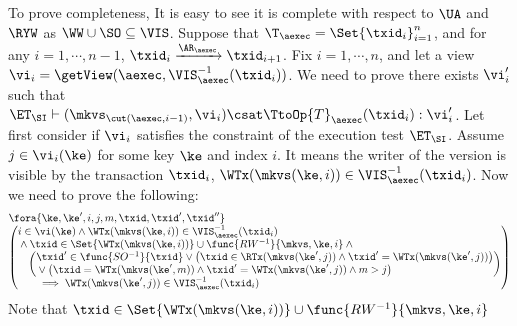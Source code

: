 To prove completeness, 
It is easy to see it is complete with respect to \( \UA \) and \( \RYW \) as \( \WW \cup \SO \subseteq \VIS \).
Suppose that $\T_{\aexec} = \Set{\txid_{i}}_{i=1}^{n}$, and for any $i=1,\cdots, n-1$,
$\txid_{i} \xrightarrow{\AR_{\aexec}} \txid_{i+1}$.
Fix $i=1,\cdots,n$, and let a view $\vi_{i} = \getView(\aexec, \VIS^{-1}_{\aexec}(\txid_{i}))$.
We need to prove there exists \( \vi'_i \) such that 
\( \ET_\SI \vdash ( \mkvs_{\cut(\aexec, i-1)}, \vi_i ) \csat \TtoOp{T}_{\aexec}(\txid_{i}) : \vi'_{i} \).
Let first consider if \( \vi_i \) satisfies the constraint of the execution test \( \ET_\SI \).
Assume \( j \in \vi_i(\ke) \) for some key \(\ke \) and index \( i \).
It means the writer  of the version is visible by the transaction \( \txid_i\),
\ie \( \WTx(\mkvs(\ke,i)) \in \VIS^{-1}_{\aexec}(\txid_{i}) \).
Now we need to prove the following:
\begin{gather}
    \label{equ:si-complete-arvis}
    \begin{array}{@{}l@{}}
        \fora{\ke, \ke', i, j, m, \txid, \txid', \txid''} \\
        \left( \begin{array}{@{}l@{}}
        i \in \vi(\ke) 
        \land \WTx(\mkvs(\ke,i)) \in \VIS^{-1}_{\aexec}(\txid_{i}) \\
        {} \land \txid \in \Set{\WTx(\mkvs(\ke,i))} \cup \func{RW^{-1}}{\mkvs, \ke, i} \land {} \\
        \quad \left(
            \begin{array}{@{}l @{}}
                \txid' \in \func{SO^{-1}}{\txid} \lor
                \left( \begin{array}{@{}l@{}}
                        \txid \in \RTx(\mkvs(\ke',j)) \land \txid' = \WTx(\mkvs(\ke',j))
                \end{array} \right) \\
                {} \lor \left( \begin{array}{@{}l@{}}
                        \txid = \WTx(\mkvs(\ke',m)) \land \txid' = \WTx(\mkvs(\ke',j)) \land m > j
                \end{array} \right) 
            \end{array}
            \right)  \\
        \qquad \implies \WTx(\mkvs(\ke',j)) \in \VIS^{-1}_{\aexec}(\txid_{i})
        \end{array} \right)
    \end{array} 
\end{gather}
Note that \( \txid \in \Set{\WTx(\mkvs(\ke,i))} \cup \func{RW^{-1}}{\mkvs, \ke, i} \) 
